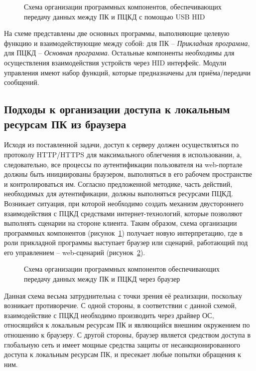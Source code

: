 \begin{figure}[h!]
\center{\texttt{[image: 3-3-1]}}
\caption{Схема организации программных компонентов, обеспечивающих передачу
данных между ПК и ПЦКД с помощью USB HID}
\label{ris:3.3.1}
\end{figure}
 
На схеме представлены две основных программы, выполняющие целевую функцию и
взаимодействующие между собой: для ПК -- \textit{Прикладная программа}, для ПЦКД
-- \textit{Основная программа}. Остальные компоненты необходимы для
осуществления взаимодействия устройств через HID интерфейс. Модули управления
имеют набор функций, которые предназначены для приёма/передачи сообщений.

\subsection{Подходы к организации доступа к локальным ресурсам ПК из браузера}

Исходя из поставленной задачи, доступ к серверу должен осуществляться по
протоколу HTTP/HTTPS для максимального облегчения в использовании, а,
следовательно, все процессы по аутентификации пользователя на web-портале должны
быть инициированы браузером, выполняться в его рабочем пространстве и
контролироваться им. Согласно предложенной методике, часть действий, необходимых
для аутентификации, должны выполняться ресурсами ПЦКД. Возникает ситуация, при
которой необходимо создать механизм двустороннего взаимодействия с ПЦКД
средствами интернет-технологий, которые позволяют выполнять сценарии на стороне
клиента. Таким образом, схема организации программных компонентов
(рисунок~\ref{ris:3.3.1}) получает новую интерпретацию, где в роли прикладной
программы выступает браузер или сценарий, работающий под его управлением –
web-сценарий (рисунок~\ref{ris:3.3.2}).

\begin{figure}[h!]
\center{\texttt{[image: 3-3-2]}}
\caption{Схема организации программных компонентов обеспечивающих передачу
данных между ПК и ПЦКД через браузер}
\label{ris:3.3.2}
\end{figure}

Данная схема весьма затруднительна с точки зрения её реализации, поскольку
возникает противоречие. С одной стороны, в соответствии с данной схемой,
взаимодействие с ПЦКД необходимо производить через драйвер ОС, относящийся к
локальным ресурсам ПК и являющийся внешним окружением по отношению к браузеру. С
другой стороны, браузер является средством доступа в глобальную сеть и имеет
мощные средства защиты от несанкционированного доступа к локальным ресурсам ПК,
и пресекает любые попытки обращения к ним.

